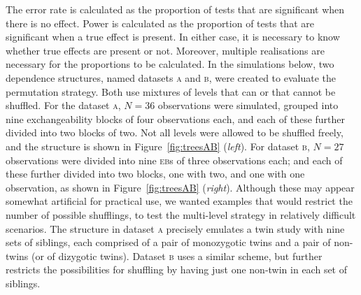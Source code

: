 The error rate is calculated as the proportion of tests that are significant when there is no effect. Power is calculated as the proportion of tests that are significant when a true effect is present. In either case, it is necessary to know whether true effects are present or not. Moreover, multiple realisations are necessary for the proportions to be calculated. In the simulations below, two dependence structures, named datasets \textsc{a} and \textsc{b}, were created to evaluate the permutation strategy. Both use mixtures of levels that can or that cannot be shuffled. For the dataset \textsc{a}, $N=36$ observations were simulated, grouped into nine exchangeability blocks of four observations each, and each of these further divided into two blocks of two. Not all levels were allowed to be shuffled freely, and the structure is shown in Figure~\ref{fig:treesAB} (\emph{left}). For dataset \textsc{b}, $N=27$ observations were divided into nine \textsc{eb}s of three observations each; and each of these further divided into two blocks, one with two, and one with one observation, as shown in Figure~\ref{fig:treesAB} (\emph{right}). Although these may appear somewhat artificial for practical use, we wanted examples that would restrict the number of possible shufflings, to test the multi-level strategy in relatively difficult scenarios. The structure in dataset \textsc{a} precisely emulates a twin study with nine sets of siblings, each comprised of a pair of monozygotic twins and a pair of non-twins (or of dizygotic twins). Dataset \textsc{b} uses a similar scheme, but further restricts the possibilities for shuffling by having just one non-twin in each set of siblings.

